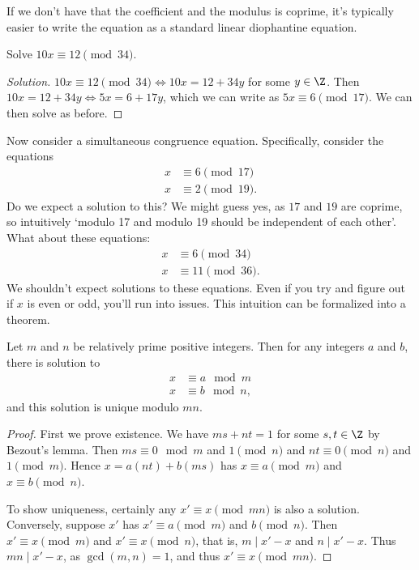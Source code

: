 \documentclass[a4paper]{scrreprt}
\begin{document}
If we don't have that the coefficient and the modulus is coprime, it's typically easier to write the equation as a standard linear diophantine equation.

\begin{example}
	Solve $10x \equiv 12 \pmod{34}$.
\end{example}
\begin{proof}[Solution]
	$10x \equiv 12 \pmod{34} \iff 10x = 12 + 34 y$ for some $y \in \Z$. Then $10x = 12 + 34y \iff 5x = 6 + 17 y$, which we can write as $5x \equiv 6 \pmod{17}$. We can then solve as before. 
\end{proof}

Now consider a simultaneous congruence equation. Specifically, consider the equations
\begin{align*}
	x &\equiv 6 \pmod{17} \\
	x &\equiv 2 \pmod{19}.
\end{align*}
Do we expect a solution to this? We might guess yes, as $17$ and $19$ are coprime, so intuitively `modulo 17 and modulo 19 should be independent of each other'. What about these equations:
\begin{align*}
	x &\equiv 6 \pmod{34} \\
	x &\equiv 11 \pmod{36}.
\end{align*}
We shouldn't expect solutions to these equations. Even if you try and figure out if $x$ is even or odd, you'll run into issues. This intuition can be formalized into a theorem.

\begin{theorem}
	Let $m$ and $n$ be relatively prime positive integers. Then for any integers $a$ and $b$, there is solution to
	\begin{align*}
		x &\equiv a \mod{m} \\
		x &\equiv b \mod{n},
	\end{align*}
	and this solution is unique modulo $mn$. 
\end{theorem}
\begin{proof}
	First we prove existence. We have $ms + nt = 1$ for some $s, t \in \Z$ by Bezout's lemma. Then $ms \equiv 0 \mod{m}$ and $1 \pmod{n}$ and $nt \equiv 0 \pmod{n}$ and $1 \pmod{m}$. Hence
	$x = a(nt) + b(ms)$ has $x \equiv a \pmod{m}$ and $x \equiv b \pmod{n}$.

	To show uniqueness, certainly any $x' \equiv x \pmod{mn}$ is also a solution. Conversely, suppose $x'$ has $x' \equiv a \pmod{m}$ and $b \pmod{n}$. Then $x' \equiv x \pmod{m}$ and $x' \equiv x \pmod{n}$, that is, $m \mid x' - x$ and $n \mid x' - x$. Thus $mn \mid x' - x$, as $\gcd(m, n) = 1$, and thus $x' \equiv x \pmod{mn}$.
\end{proof}
\end{document}

